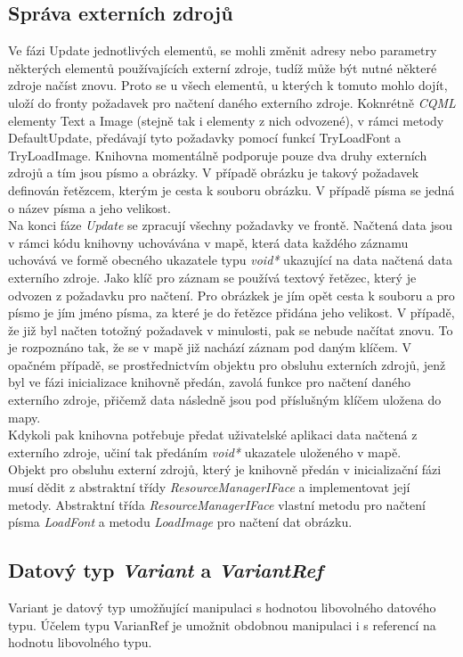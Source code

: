 \documentclass[11pt,twoside,a4paper]{book}
\begin{document}
\subsection{Správa externích zdrojů}
Ve fázi Update jednotlivých elementů, se mohli změnit adresy nebo parametry některých elementů používajících externí zdroje, tudíž může být nutné některé zdroje načíst znovu. Proto se u všech elementů, u kterých k tomuto mohlo dojít, uloží do fronty požadavek pro načtení daného externího zdroje. Koknrétně \textit{CQML} elementy Text a Image (stejně tak i elementy z nich odvozené), v rámci metody DefaultUpdate, předávají tyto požadavky pomocí funkcí TryLoadFont a TryLoadImage. Knihovna momentálně podporuje pouze dva druhy externích zdrojů a tím jsou písmo a obrázky. V případě obrázku je takový požadavek definován řetězcem, kterým je cesta k souboru obrázku. V případě písma se jedná o název písma a jeho velikost. \\
Na konci fáze \textit{Update} se zpracují všechny požadavky ve frontě. Načtená data jsou v rámci kódu knihovny uchovávána v mapě, která data každého záznamu uchovává ve formě obecného ukazatele typu \textit{void*} ukazující na data načtená data externího zdroje. Jako klíč pro záznam se používá textový řetězec, který je odvozen z požadavku pro načtení. Pro obrázkek je jím opět cesta k souboru a pro písmo je jím jméno písma, za které je do řetězce přidána jeho velikost. V případě, že již byl načten totožný požadavek v minulosti, pak se nebude načítat znovu. To je rozpoznáno tak, že se v mapě již nachází záznam pod daným klíčem. V opačném případě, se prostřednictvím objektu pro obsluhu externích zdrojů, jenž byl ve fázi inicializace knihovně předán, zavolá funkce pro načtení daného externího zdroje, přičemž data následně jsou pod příslušným klíčem uložena do mapy.\\
Kdykoli pak knihovna potřebuje předat uživatelské aplikaci data načtená z externího zdroje, učiní tak předáním \textit{void*} ukazatele uloženého v mapě.\\
Objekt pro obsluhu externí zdrojů, který je knihovně předán v inicializační fázi musí dědit z abstraktní třídy \textit{ResourceManagerIFace} a implementovat její metody. Abstraktní třída \textit{ResourceManagerIFace} vlastní metodu pro načtení písma \textit{LoadFont} a metodu \textit{LoadImage} pro načtení dat obrázku.

\subsection{Datový typ \textit{Variant} a \textit{VariantRef}}
Variant je datový typ umožňující manipulaci s hodnotou libovolného datového typu. Účelem typu VarianRef je umožnit obdobnou manipulaci i s referencí na hodnotu libovolného typu.\\
\end{document}
